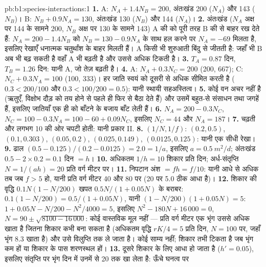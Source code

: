 \begin{solution}{pb:b1:species-interactions:1}
\textbf{1.} A: $N_A + 1.4 N_B = 200$, अंतःखंड 200 ($N_A$) और 143
($N_B$)। B: $N_B + 0.9 N_A = 130$, अंतःखंड 130 ($N_B$) और 144
($N_A$)।
\textbf{2.} अंतःखंड ($N_A$ अक्ष पर 144 के सामने 200, $N_B$ अक्ष पर
130 के सामने 143) A की  को पूरी तरह B की  से बाहर रख देते
हैं: $N_A = 200 - 1.4 N_B$ को $N_B = 130 - 0.9 N_A$ के साथ हल करने पर
$N_A = -69$ मिलता है, इसलिए रेखाएँ धनात्मक चतुर्थांश के बाहर मिलती हैं।
A किसी भी शुरुआती बिंदु से जीतती है: जहाँ भी B अब भी बढ़ सकती है वहाँ A
भी बढ़ती है और उससे अधिक टिकती है।
\textbf{3.} $T_A = 0.87$ दिन, $T_B = 1.26$ दिन: यानी A, जो तेज़
बढ़ती है।
\textbf{4.} A: $N_A + 0.3 N_C = 200$ (200, 667); C: $N_C + 0.3 N_A =
100$ (100, 333)। हर जाति स्वयं को दूसरी से अधिक सीमित करती है
($0.3 < 200/100$ और $0.3 < 100/200 = 0.5$): यानी स्थायी सहअस्तित्व।
\textbf{5.} कोई वन अचर नहीं है (ऋतुएँ, विक्षोभ दौड़ को तय होने से
पहले ही फिर से बैठा देते हैं) और उसमें बहुत-से संसाधन तथा जगहें हैं, इसलिए
जातियाँ एक ही को बाँटने के बजाय  बाँट लेती हैं।
\textbf{6.} $N_A = 200 - 0.3 N_C$, $N_C = 100 - 0.3 N_A = 100 - 60 +
0.09 N_C$, इसलिए $N_C = 44$ और $N_A = 187$।
\textbf{7.} चढ़ती और लगभग 10 की ओर चपटी होती: यानी प्रकार II.
\textbf{8.} $(1/N, 1/f)$: $(0.2, 0.5)$, $(0.1, 0.303)$, $(0.05, 0.2)$,
$(0.025, 0.149)$, $(0.0125, 0.125)$: यानी एक सीधी रेखा।
\textbf{9.} ढाल $(0.5 - 0.125)/(0.2 - 0.0125) = 2.0 = 1/a$, इसलिए $a =
\qty{0.5}{m^2/d}$; अंतःखंड $0.5 - 2\times 0.2 = 0.1$ दिन $= h$।
\textbf{10.} अधिकतम $1/h = 10$ शिकार प्रति दिन; अर्ध-संतृप्ति $N =
1/(ah) = 20$ प्रति वर्ग मीटर पर।
\textbf{11.} निपटान अंश $= f h = f/10$: यानी आधे से अधिक तब जब $f
> 5$ हो, यानी प्रति वर्ग मीटर 40 और 80 पर (20 पर 5.0 ठीक आधा है)।
\textbf{12.} शिकार की वृद्धि $0.1 N (1 - N/200)$ खपत
$0.5N/(1 + 0.05N)$ के बराबर: $0.1(1 - N/200) = 0.5/(1 + 0.05 N)$, यानी
$(1 - N/200)(1 + 0.05N) = 5$: $1 + 0.05N - N/200 - N^2/4000 = 5$, इसलिए
$N^2 - 180 N + 16\,000 = 0$, $N = 90 \pm \sqrt{8100 - 16\,000}$: कोई
वास्तविक मूल नहीं --- प्रति वर्ग मीटर एक भृंग उससे अधिक खाता है जितना
शिकार कभी बना सकता है (अधिकतम वृद्धि $rK/4 = 5$ प्रति दिन, $N = 100$ पर,
जहाँ भृंग 8.3 खाता है) और उसे विलुप्ति तक ले जाता है। कोई साम्य नहीं;
शिकार तभी टिकता है जब भृंग कम हों या शिकार के पास शरणस्थल हों।
\textbf{13.} दूसरे शिकार के लिए  आधा हो जाता है ($h' = 0.05$),
इसलिए संतृप्ति पर भृंग दिन में उनमें से 20 तक खा लेता है: ऊँचे घनत्व पर

\end{solution}
